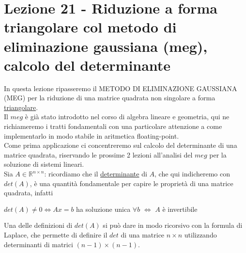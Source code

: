 \section[Lezione 21 - Metodo di Gauss, calcolo determinante]{Lezione 21 - Riduzione a forma triangolare col metodo di eliminazione gaussiana (meg), calcolo del determinante}
In questa lezione ripasseremo il METODO DI ELIMINAZIONE GAUSSIANA (MEG) per la riduzione di una matrice quadrata non singolare a forma \uline{triangolare}.\\ Il $meg$ è già stato introdotto nel corso di algebra lineare e geometria, qui ne richiameremo i tratti fondamentali con una particolare attenzione a come implementarlo in modo stabile in aritmetica floating-point.\\Come prima applicazione ci concentreremo sul calcolo del determinante di una matrice quadrata, riservando le prossime 2 lezioni all'analisi del $meg$ per la soluzione di sistemi lineari.\\Sia $A\in\mathbb{R}^{n\times n}$: ricordiamo che il \uline{determinante} di $A$, che qui indicheremo con $det(A)$, è una quantità fondamentale per capire le proprietà di una matrice quadrata, infatti 
\begin{center}
    $det(A)\neq0\iff Ax=b$ ha soluzione unica $\forall b$ $\iff$ $A$ è invertibile 
\end{center}
Una delle definizioni di $det(A)$ si può dare in modo ricorsivo con la formula di Laplace, che permette di definire il $det$ di una matrice $n\times n$ utilizzando determinanti di matrici $(n-1)\times(n-1)$.

